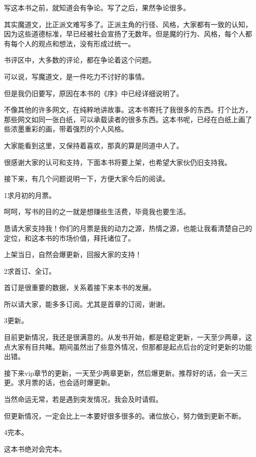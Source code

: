 \begin{this_body}
写这本书之前，就知道会有争论。写了之后，果然争论很多。

其实魔道文，比正派文难写多了。正派主角的行径、风格，大家都有一致的认知，因为这些道德标准，早已经被社会宣扬了无数年。但是魔的行为、风格，每个人都有每个人的观点和想法，没有形成过统一。

书评区中，大多数的评论，都在争论着这个问题。

可以说，写魔道文，是一件吃力不讨好的事情。

但是我仍旧要写，原因在本书的《序》中已经详细说明了。

不像其他的许多网文，在纯粹地讲故事。这本书寄托了我很多的东西。打个比方，那些网文如同一张白纸，可以承载读者的很多东西。这本书呢，已经在白纸上画了些浓墨重彩的画，带着强烈的个人风格。

大家能看到这里，又保持着喜欢，那真的算是同道中人了。

很感谢大家的认可和支持，下面本书将要上架，也希望大家伙仍旧支持我。

接下来，有几个问题说明一下，方便大家今后的阅读。

1求月初的月票。

呵呵，写书的目的之一就是想赚些生活费，毕竟我也要生活。

恳请大家支持我！你们的月票是我的动力之源，热情之源，也能让我看清楚自己的定位，和这本书的市场价值，拜托诸位了。

上架当日，自然会爆更新，回报大家的支持！

2求首订、全订。

首订是很重要的数据，关系着接下来本书的发展。

所以请大家，能多多订阅。尤其是首章的订阅，谢谢。

3更新。

目前更新情况，我还是很满意的。从发书开始，都是稳定更新，一天至少两章，这点大家有目共睹。期间虽然出了些意外情况，但那都是起点后台的定时更新的功能出错。

接下来vip章节的更新，一天至少两章更新，然后爆更新。推荐好的话，会一天三更。求月票的话，也会适时爆更新。

当然命运无常，若是遇到突发情况，我会及时请假。

但更新情况，一定会比上一本要好很多很多的。诸位放心，努力做到更新不断。

4完本。

这本书绝对会完本。


\end{this_body}
